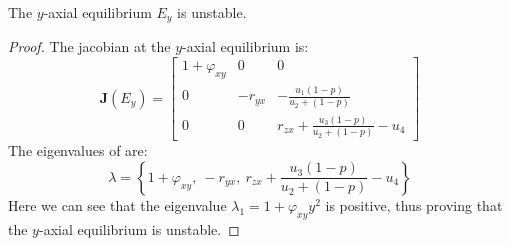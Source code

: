 \begin{theorem}\label{thm:eq-axial-y-stability}
    The $y$-axial equilibrium $E_y$ is unstable.
\end{theorem}
\begin{proof}
    The jacobian at the $y$-axial equilibrium is:
    \begin{equation}\label{matrix:jacobian-axial-y}
        \textbf{J}\left(E_y\right) = \begin{bmatrix}
            1+\varphi_{xy} & 0 & 0\\
            0 & -r_{yx} & -\frac{u_1\left(1-p\right)}{u_2+\left(1-p\right)}\\
            0 & 0 & r_{zx}+\frac{u_3\left(1-p\right)}{u_2+\left(1-p\right)}-u_4
        \end{bmatrix}
    \end{equation}
    The eigenvalues of  are:
    \begin{equation*}
        \lambda=\left\{1+\varphi_{xy},\ -r_{yx},\ r_{zx}+\frac{u_3\left(1-p\right)}{u_2+\left(1-p\right)}-u_4\right\}
    \end{equation*}
    Here we can see that the eigenvalue $\lambda_1=1+\varphi_{xy}y^2$ is positive, thus proving that the $y$-axial equilibrium is unstable.
\end{proof}

